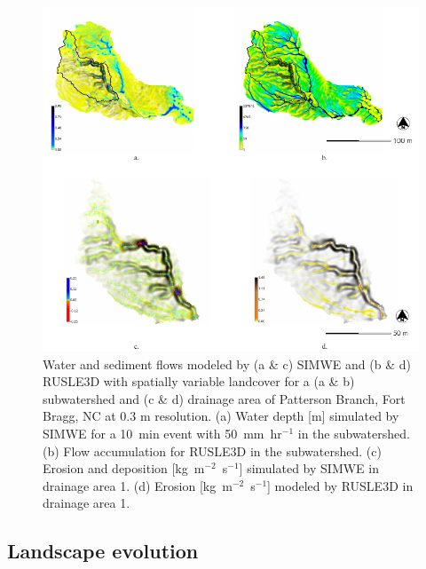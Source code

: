 \documentclass[gmd, manuscript]{copernicus}
\begin{document}
\begin{figure}
\center
\includegraphics[width=\textwidth,height=0.95\textheight,keepaspectratio]{figures/models.pdf}
\caption{Water and sediment flows 
modeled by (a \& c) SIMWE and (b \& d) RUSLE3D with spatially variable landcover 
for a (a \& b) subwatershed and (c \& d) drainage area of Patterson Branch, Fort Bragg, NC
at 0.3 \unit{m} resolution.
(a) Water depth [m] simulated by SIMWE for a 10~\unit{min} event with 50~\unit{mm~hr}$^{-1}$ in the subwatershed.
(b) Flow accumulation for RUSLE3D in the subwatershed.
(c) Erosion and deposition [\unit{kg~m}$^{-2}$~\unit{s}$^{-1}$] simulated by SIMWE in drainage area 1.
(d) Erosion [\unit{kg~m}$^{-2}$~\unit{s}$^{-1}$] modeled by RUSLE3D in drainage area 1.
}
\label{fig:models}
\end{figure}


\subsection{Landscape evolution}
\end{document}
